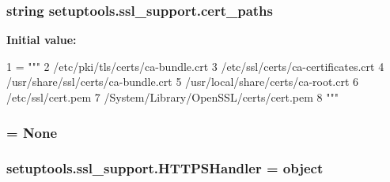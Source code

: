 \subsubsection[{cert\+\_\+paths}]{\setlength{\rightskip}{0pt plus 5cm}string setuptools.\+ssl\+\_\+support.\+cert\+\_\+paths}\label{namespacesetuptools_1_1ssl__support_a3b596fad36adc8396fb3eebc33b00cda}
{\bfseries Initial value\+:}
\begin{DoxyCode}
1 = \textcolor{stringliteral}{"""}
2 \textcolor{stringliteral}{/etc/pki/tls/certs/ca-bundle.crt}
3 \textcolor{stringliteral}{/etc/ssl/certs/ca-certificates.crt}
4 \textcolor{stringliteral}{/usr/share/ssl/certs/ca-bundle.crt}
5 \textcolor{stringliteral}{/usr/local/share/certs/ca-root.crt}
6 \textcolor{stringliteral}{/etc/ssl/cert.pem}
7 \textcolor{stringliteral}{/System/Library/OpenSSL/certs/cert.pem}
8 \textcolor{stringliteral}{"""}
\end{DoxyCode}
\hypertarget{namespacesetuptools_1_1ssl__support_ac1a38bae98615d399c0145a6efb165e5}{}
\subsubsection[{Certificate\+Error}]{ = None}\label{namespacesetuptools_1_1ssl__support_ac1a38bae98615d399c0145a6efb165e5}
\hypertarget{namespacesetuptools_1_1ssl__support_af7187d08f1ac5df0ac0382808f2a47d5}{}
\subsubsection[{H\+T\+T\+P\+S\+Handler}]{\setlength{\rightskip}{0pt plus 5cm}setuptools.\+ssl\+\_\+support.\+H\+T\+T\+P\+S\+Handler = object}\label{namespacesetuptools_1_1ssl__support_af7187d08f1ac5df0ac0382808f2a47d5}
\hypertarget{namespacesetuptools_1_1ssl__support_a7f0e0bdf1c4ae2136919ca7662df6094}{}

